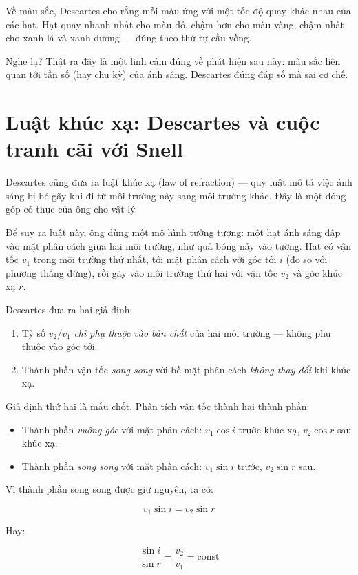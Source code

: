 Về màu sắc, Descartes cho rằng mỗi màu ứng với một tốc độ quay khác nhau của các hạt. Hạt quay nhanh nhất cho màu đỏ, chậm hơn cho màu vàng, chậm nhất cho xanh lá và xanh dương — đúng theo thứ tự cầu vồng.

Nghe lạ? Thật ra đây là một linh cảm đúng về phát hiện sau này: màu sắc liên quan tới tần số (hay chu kỳ) của ánh sáng. Descartes đúng đáp số mà sai cơ chế.


\section{Luật khúc xạ: Descartes và cuộc tranh cãi với Snell}

Descartes cũng đưa ra luật khúc xạ (law of refraction) — quy luật mô tả việc ánh sáng bị bẻ gãy khi đi từ môi trường này sang môi trường khác. Đây là một đóng góp có thực của ông cho vật lý.

Để suy ra luật này, ông dùng một mô hình tưởng tượng: một hạt ánh sáng đập vào mặt phân cách giữa hai môi trường, như quả bóng nảy vào tường. Hạt có vận tốc $v_1$ trong môi trường thứ nhất, tới mặt phân cách với góc tới $i$ (đo so với phương thẳng đứng), rồi gãy vào môi trường thứ hai với vận tốc $v_2$ và góc khúc xạ $r$.

Descartes đưa ra hai giả định:

\begin{enumerate}
  \item Tỷ số $v_2 / v_1$ \emph{chỉ phụ thuộc vào bản chất} của hai môi trường — không phụ thuộc vào góc tới.
  \item Thành phần vận tốc \emph{song song} với bề mặt phân cách \emph{không thay đổi} khi khúc xạ.
\end{enumerate}

Giả định thứ hai là mấu chốt. Phân tích vận tốc thành hai thành phần:

\begin{itemize}
  \item Thành phần \emph{vuông góc} với mặt phân cách: $v_1 \cos i$ trước khúc xạ, $v_2 \cos r$ sau khúc xạ.
  \item Thành phần \emph{song song} với mặt phân cách: $v_1 \sin i$ trước, $v_2 \sin r$ sau.
\end{itemize}

Vì thành phần song song được giữ nguyên, ta có:

$$v_1 \sin i = v_2 \sin r$$

Hay:

$$\frac{\sin i}{\sin r} = \frac{v_2}{v_1} = \mathrm{const}$$

